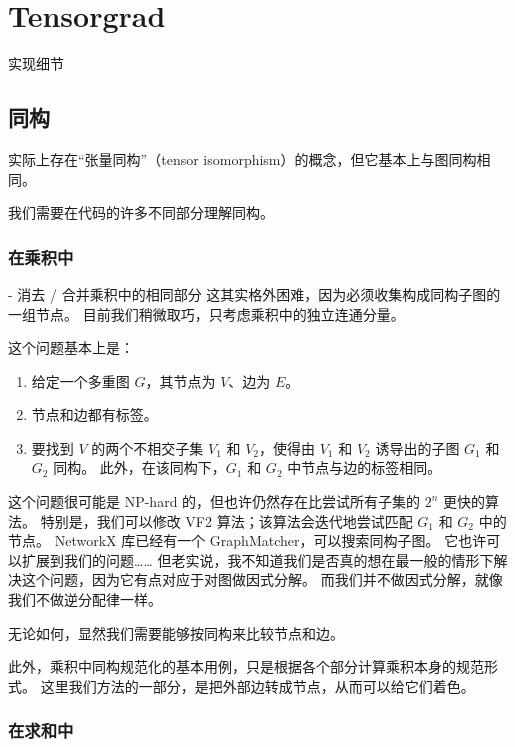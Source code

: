 
\chapter{Tensorgrad}

实现细节

\section{同构}
实际上存在“张量同构”（tensor isomorphism）的概念，但它基本上与图同构相同。

我们需要在代码的许多不同部分理解同构。

\subsection{在乘积中}
- 消去 / 合并乘积中的相同部分
这其实格外困难，因为必须收集构成同构子图的一组节点。
目前我们稍微取巧，只考虑乘积中的独立连通分量。

\begin{figure}[h]
\end{figure}

这个问题基本上是：
\begin{enumerate}
   \item 给定一个多重图 $G$，其节点为 $V$、边为 $E$。
   \item 节点和边都有标签。
   \item 要找到 $V$ 的两个不相交子集 $V_1$ 和 $V_2$，使得由 $V_1$ 和 $V_2$ 诱导出的子图 $G_1$ 和 $G_2$ 同构。
      此外，在该同构下，$G_1$ 和 $G_2$ 中节点与边的标签相同。
\end{enumerate}

这个问题很可能是 NP-hard 的，但也许仍然存在比尝试所有子集的 $2^n$ 更快的算法。
特别是，我们可以修改 VF2 算法；该算法会迭代地尝试匹配 $G_1$ 和 $G_2$ 中的节点。
NetworkX 库已经有一个 GraphMatcher，可以搜索同构子图。
它也许可以扩展到我们的问题……
但老实说，我不知道我们是否真的想在最一般的情形下解决这个问题，因为它有点对应于对图做因式分解。
而我们并不做因式分解，就像我们不做逆分配律一样。

无论如何，显然我们需要能够按同构来比较节点和边。

此外，乘积中同构规范化的基本用例，只是根据各个部分计算乘积本身的规范形式。
这里我们方法的一部分，是把外部边转成节点，从而可以给它们着色。

\subsection{在求和中}

